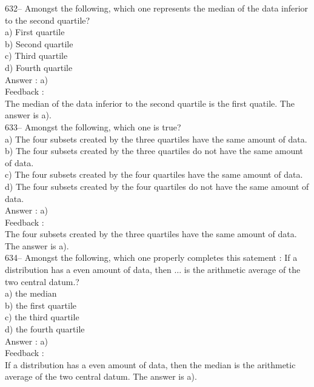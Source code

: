 \documentclass[letterpaper, 12pt]{article}
\begin{document}
632-- Amongst the following, which one represents the median of the data inferior to the second quartile?\\
a) First quartile\\
b) Second quartile\\
c) Third quartile\\
d) Fourth quartile\\

Answer : a)\\

Feedback : \\
The median of the data inferior to the second quartile is the first quatile. The answer is a).\\

633-- Amongst the following, which one is true?\\
a) The four subsets created by the three quartiles have the same amount of data.   \\
b) The four subsets created by the three quartiles do not have the same amount of data.  \\
c) The four subsets created by the four quartiles have the same amount of data. \\
d) The four subsets created by the four quartiles do not have the same amount of data.  \\

Answer : a)\\

Feedback : \\
The four subsets created by the three quartiles have the same amount of data.  The answer is a).\\

634-- Amongst the following, which one properly completes this satement : \og If a distribution has a even amount of data, then $\ldots$ is the arithmetic average of the two central datum.\fg?\\
a) the median\\
b) the first quartile\\
c) the third quartile\\
d) the fourth quartile\\

Answer : a)\\

Feedback :\\
If a distribution has a even amount of data, then the median is the arithmetic average of the two central datum.  The answer is a).
\\
\end{document}
